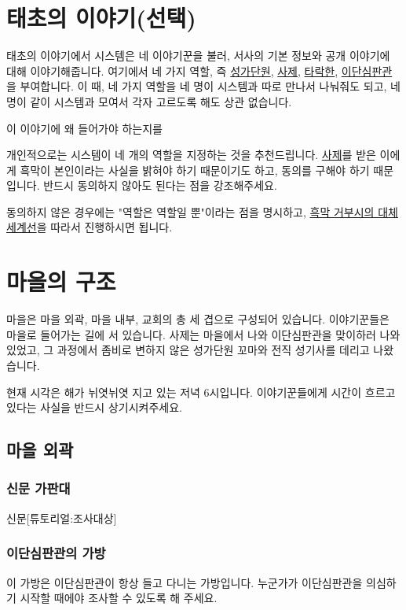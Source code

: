 \documentclass{report}
\begin{document}
	\section{태초의 이야기(선택)}
		태초의 이야기에서 시스템은 네 이야기꾼을 불러, 서사의 기본 정보와 공개 이야기에 대해 이야기해줍니다. 여기에서 네 가지 역할, 즉 \hyperlink{cursed-bard}{성가단원}, \hyperlink{cowardly-priest}{사제}, \hyperlink{corrupt-paladin}{타락한}, \hyperlink{hurt-rogue}{이단심판관}을 부여합니다. 이 때, 네 가지 역할을 네 명이 시스템과 따로 만나서 나눠줘도 되고, 네명이 같이 시스템과 모여서 각자 고르도록 해도 상관 없습니다.
		
		이 이야기에 왜 들어가야 하는지를 
		
		개인적으로는 시스템이 네 개의 역할을 지정하는 것을 추천드립니다. \hyperlink{cowardly-priest}{사제}를 받은 이에게 흑막이 본인이라는 사실을 밝혀야 하기 때문이기도 하고, 동의를 구해야 하기 때문입니다. 반드시 동의하지 않아도 된다는 점을 강조해주세요.
		
		동의하지 않은 경우에는 "역할은 역할일 뿐"이라는 점을 명시하고, \hyperlink{alternative:no-criminal}{흑막 거부시의 대체 세계선}을 따라서 진행하시면 됩니다.
	
	\section{마을의 구조}
		마을은 마을 외곽, 마을 내부, 교회의 총 세 겹으로 구성되어 있습니다. 이야기꾼들은 마을로 들어가는 길에 서 있습니다. 사제는 마을에서 나와 이단심판관을 맞이하러 나와있었고, 그 과정에서 좀비로 변하지 않은 성가단원 꼬마와 전직 성기사를 데리고 나왔습니다.
		
		현재 시각은 해가 뉘엿뉘엿 지고 있는 저녁 6시입니다. 이야기꾼들에게 시간이 흐르고 있다는 사실을 반드시 상기시켜주세요.
		
			\subsection{마을 외곽}
				\hypertarget{search:newspaper-stand}{}
				\subsubsection*{신문 가판대}
					\begin{spoiler}{신문}{[튜토리얼:조사대상]}
					\end{spoiler}
				
				\hypertarget{search:rogue-bag}{}
				\subsubsection*{이단심판관의 가방}
					이 가방은 이단심판관이 항상 들고 다니는 가방입니다. 누군가가 이단심판관을 의심하기 시작할 때에야 조사할 수 있도록 해 주세요.
					
\end{document}

